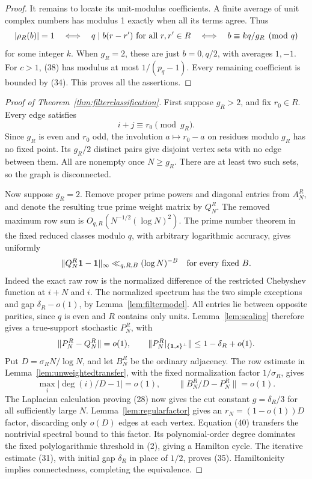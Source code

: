 \begin{proof}
It remains to locate its unit-modulus coefficients.
A finite average of unit complex numbers has modulus 1
exactly when all its terms agree. Thus
\[
 |\rho_R(b)|=1
 \quad\Longleftrightarrow\quad
 q\mid b(r-r')\ \hbox{for all }r,r'\in R
 \quad\Longleftrightarrow\quad
 b\equiv kq/g_R\pmod q
\]
for some integer \(k\).
When \(g_R=2\), these are just \(b=0,q/2\), with averages
\(1,-1\).
For \(c>1\), (38) has modulus at most \(1/(p_q-1)\).
Every remaining coefficient is bounded by (34).
This proves all the assertions.
\end{proof}

\begin{proof}[Proof of Theorem~\ref{thm:filterclassification}]
First suppose \(g_R>2\), and fix \(r_0\in R\).
Every edge satisfies
\[
 i+j\equiv r_0\pmod {g_R}.
\]
Since \(g_R\) is even and \(r_0\) odd, the involution
\(a\mapsto r_0-a\) on residues modulo \(g_R\) has no fixed point.
Its \(g_R/2\) distinct pairs give disjoint vertex sets with
no edge between them. All are nonempty once \(N\geq g_R\).
There are at least two such sets, so the graph is disconnected.

Now suppose \(g_R=2\).
Remove proper prime powers and diagonal entries from \(A_N^R\),
and denote the resulting true prime weight matrix by \(Q_N^R\).
The removed maximum row sum is
\(O_{q,R}(N^{-1/2}(\log N)^2)\).
The prime number theorem in the fixed reduced classes modulo
\(q\), with arbitrary logarithmic accuracy, gives uniformly
\[
 \|Q_N^R\mathbf1-\mathbf1\|_\infty\ll_{q,R,B}(\log N)^{-B}
 \quad\hbox{for every fixed }B.
\]
Indeed the exact raw row is the normalized difference of the
restricted Chebyshev function at \(i+N\) and \(i\).
The normalized spectrum has the two simple exceptions and
gap \(\delta_R-o(1)\), by Lemma~\ref{lem:filtermodel}.
All entries lie between opposite parities, since \(q\) is even
and \(R\) contains only units.
Lemma~\ref{lem:scaling} therefore gives a true-support
stochastic \(P_N^R\), with
\[
 \|P_N^R-Q_N^R\|=o(1),\qquad
 \|P_N^R|_{\{\mathbf1,s\}^\perp}\|\leq1-\delta_R+o(1).
\]
Put \(D=\sigma_R N/\log N\), and let \(B_N^R\) be the
ordinary adjacency.
The row estimate in Lemma~\ref{lem:unweightedtransfer}, with
the fixed normalization factor \(1/\sigma_R\), gives
\[
 \max_i|\deg(i)/D-1|=o(1),\qquad
 \|B_N^R/D-P_N^R\|=o(1).                                    \tag{40}
\]
The Laplacian calculation proving (28) now gives the cut
constant \(g=\delta_R/3\) for all sufficiently large \(N\).
Lemma~\ref{lem:regularfactor} gives an
\(r_N=(1-o(1))D\) factor, discarding only \(o(D)\)
edges at each vertex.
Equation (40) transfers the nontrivial spectral bound to this
factor. Its polynomial-order degree dominates the fixed
polylogarithmic threshold in (2), giving a Hamilton cycle.
The iterative estimate (31), with initial gap \(\delta_R\)
in place of \(1/2\), proves (35).
Hamiltonicity implies connectedness, completing the equivalence.


\end{proof}
